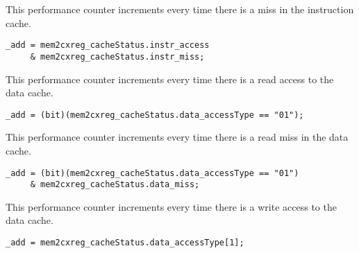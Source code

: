 
This performance counter increments every time there is a miss in the 
instruction cache.

\implementation{}
\begin{lstlisting}
_add = mem2cxreg_cacheStatus.instr_access
     & mem2cxreg_cacheStatus.instr_miss;
\end{lstlisting}


This performance counter increments every time there is a read access to the 
data cache.

\implementation{}
\begin{lstlisting}
_add = (bit)(mem2cxreg_cacheStatus.data_accessType == "01");
\end{lstlisting}


This performance counter increments every time there is a read miss in the data 
cache.

\implementation{}
\begin{lstlisting}
_add = (bit)(mem2cxreg_cacheStatus.data_accessType == "01")
     & mem2cxreg_cacheStatus.data_miss;
\end{lstlisting}


This performance counter increments every time there is a write access to the 
data cache.

\implementation{}
\begin{lstlisting}
_add = mem2cxreg_cacheStatus.data_accessType[1];
\end{lstlisting}


